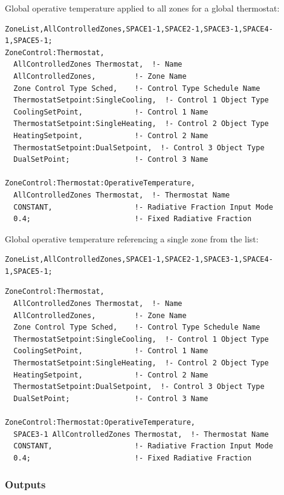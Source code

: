 Global operative temperature applied to all zones for a global thermostat:

\begin{lstlisting}
ZoneList,AllControlledZones,SPACE1-1,SPACE2-1,SPACE3-1,SPACE4-1,SPACE5-1;
ZoneControl:Thermostat,
  AllControlledZones Thermostat,  !- Name
  AllControlledZones,         !- Zone Name
  Zone Control Type Sched,    !- Control Type Schedule Name
  ThermostatSetpoint:SingleCooling,  !- Control 1 Object Type
  CoolingSetPoint,            !- Control 1 Name
  ThermostatSetpoint:SingleHeating,  !- Control 2 Object Type
  HeatingSetpoint,            !- Control 2 Name
  ThermostatSetpoint:DualSetpoint,  !- Control 3 Object Type
  DualSetPoint;               !- Control 3 Name

ZoneControl:Thermostat:OperativeTemperature,
  AllControlledZones Thermostat,  !- Thermostat Name
  CONSTANT,                   !- Radiative Fraction Input Mode
  0.4;                        !- Fixed Radiative Fraction
\end{lstlisting}

Global operative temperature referencing a single zone from the list:

\begin{lstlisting}
ZoneList,AllControlledZones,SPACE1-1,SPACE2-1,SPACE3-1,SPACE4-1,SPACE5-1;
\end{lstlisting}

\begin{lstlisting}
ZoneControl:Thermostat,
  AllControlledZones Thermostat,  !- Name
  AllControlledZones,         !- Zone Name
  Zone Control Type Sched,    !- Control Type Schedule Name
  ThermostatSetpoint:SingleCooling,  !- Control 1 Object Type
  CoolingSetPoint,            !- Control 1 Name
  ThermostatSetpoint:SingleHeating,  !- Control 2 Object Type
  HeatingSetpoint,            !- Control 2 Name
  ThermostatSetpoint:DualSetpoint,  !- Control 3 Object Type
  DualSetPoint;               !- Control 3 Name

ZoneControl:Thermostat:OperativeTemperature,
  SPACE3-1 AllControlledZones Thermostat,  !- Thermostat Name
  CONSTANT,                   !- Radiative Fraction Input Mode
  0.4;                        !- Fixed Radiative Fraction
\end{lstlisting}

\subsubsection{Outputs}\label{outputs-1-032}

